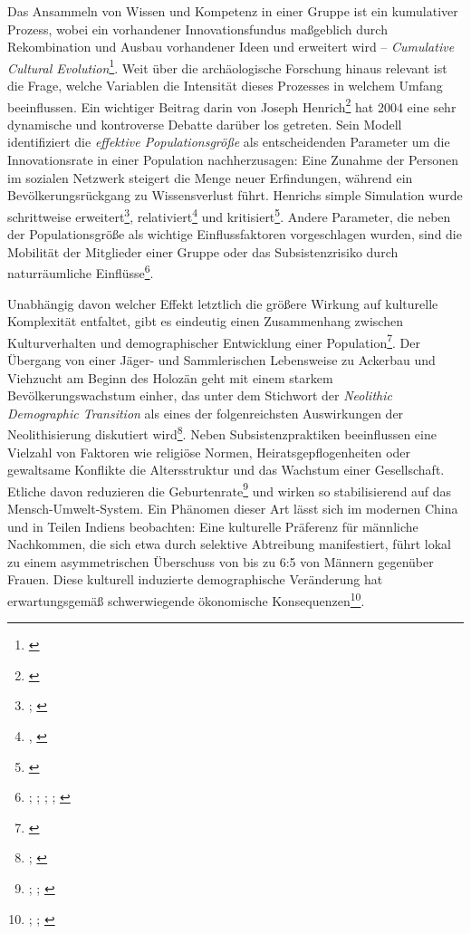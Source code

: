 \documentclass[openany,twoside,twocolumn]{book}
\let\rmarkdownfootnote\footnote%
\def\footnote{\protect\rmarkdownfootnote}
\begin{document}
Das Ansammeln von Wissen und Kompetenz in einer Gruppe ist ein
kumulativer Prozess, wobei ein vorhandener Innovationsfundus maßgeblich
durch Rekombination und Ausbau vorhandener Ideen und erweitert wird --
\emph{Cumulative Cultural Evolution}\footnote{\textcite{mesoudi_what_2018}}.
Weit über die archäologische Forschung hinaus relevant ist die Frage,
welche Variablen die Intensität dieses Prozesses in welchem Umfang
beeinflussen. Ein wichtiger Beitrag darin von Joseph Henrich\footnote{\textcite{henrich_demography_2004}}
hat 2004 eine sehr dynamische und kontroverse Debatte darüber los
getreten. Sein Modell identifiziert die \emph{effektive
Populationsgröße} als entscheidenden Parameter um die Innovationsrate in
einer Population nachherzusagen: Eine Zunahme der Personen im sozialen
Netzwerk steigert die Menge neuer Erfindungen, während ein
Bevölkerungsrückgang zu Wissensverlust führt. Henrichs simple Simulation
wurde schrittweise erweitert\footnote{\textcite{KobayashiInnovativenesspopulationsize2012};
  \textcite{henrich_understanding_2016}}, relativiert\footnote{\textcite{collard_population_2013},
  \textcite{BaldiniRevisitingEffectPopulation2015}} und
kritisiert\footnote{\textcite{vaesen_population_2016}}. Andere
Parameter, die neben der Populationsgröße als wichtige Einflussfaktoren
vorgeschlagen wurden, sind die Mobilität der Mitglieder einer Gruppe
oder das Subsistenzrisiko durch naturräumliche Einflüsse\footnote{\textcite{collard_what_2011};
  \textcite{collard_risk_2013}; \textcite{buchanan_drivers_2016};
  \textcite{fitzhugh_risk_2001};
  \textcite{winterhalder_risk-senstive_1999}}.

Unabhängig davon welcher Effekt letztlich die größere Wirkung auf
kulturelle Komplexität entfaltet, gibt es eindeutig einen Zusammenhang
zwischen Kulturverhalten und demographischer Entwicklung einer
Population\footnote{\textcite{shennan_demography_2001}}. Der Übergang
von einer Jäger- und Sammlerischen Lebensweise zu Ackerbau und Viehzucht
am Beginn des Holozän geht mit einem starkem Bevölkerungswachstum
einher, das unter dem Stichwort der \emph{Neolithic Demographic
Transition} als eines der folgenreichsten Auswirkungen der
Neolithisierung diskutiert wird\footnote{\textcite{bocquetappel_paleoanthropological_2002};
  \textcite{gage_what_2009}}. Neben Subsistenzpraktiken beeinflussen
eine Vielzahl von Faktoren wie religiöse Normen, Heiratsgepflogenheiten
oder gewaltsame Konflikte die Altersstruktur und das Wachstum einer
Gesellschaft. Etliche davon reduzieren die Geburtenrate\footnote{\textcite{smith_cultural_1992};
  \textcite{colleran_cultural_2016}; \textcite{richerson_natural_1984}}
und wirken so stabilisierend auf das Mensch-Umwelt-System. Ein Phänomen
dieser Art lässt sich im modernen China und in Teilen Indiens
beobachten: Eine kulturelle Präferenz für männliche Nachkommen, die sich
etwa durch selektive Abtreibung manifestiert, führt lokal zu einem
asymmetrischen Überschuss von bis zu 6:5 von Männern gegenüber Frauen.
Diese kulturell induzierte demographische Veränderung hat
erwartungsgemäß schwerwiegende ökonomische Konsequenzen\footnote{\textcite{banister_shortage_2004};
  \textcite{li_cultural_2000}; \textcite{tuljapurkar_high_1995}}.
\end{document}
